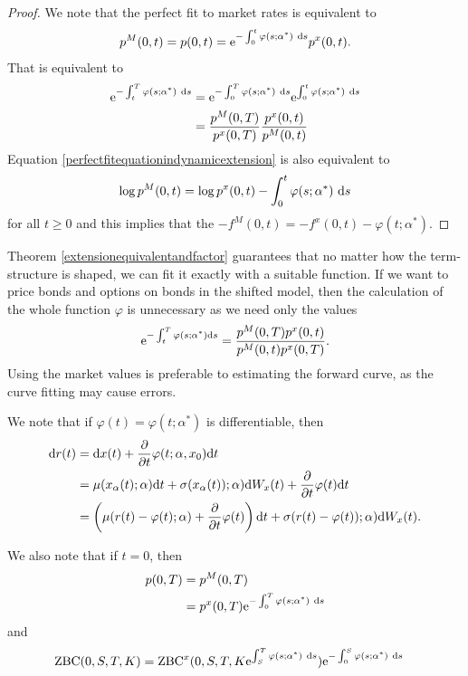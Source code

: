 \begin{proof}
We note that the perfect fit to market rates is equivalent to
	\begin{align}
		\label{perfectfitequationindynamicextension}
		p^M(0,t) = p(0,t) = \mathrm{e}^{ - \int_0^t \varphi(s; \alpha^*) \ \mathrm{d} s} p^x(0,t) .
	\end{align}
That is equivalent to
	\begin{align}
\mathrm{e}^{ - \int_t^T \varphi(s; \alpha^*) \ \mathrm{d} s} &= \mathrm{e}^{ - \int_0^T \varphi(s; \alpha^*) \ \mathrm{d} s} \mathrm{e}^{ \int_0^t \varphi(s; \alpha^*) \ \mathrm{d} s} \\
	&= \frac{p^M(0,T) }{ p^x(0,T)} \frac{ p^x(0,t)}{p^M(0,t) }
\end{align}
Equation \ref{perfectfitequationindynamicextension} is also equivalent to 
	\begin{align}
		\log p^M(0,t) = \log p^x(0,t) - \int_0^t \varphi(s; \alpha^*) \ \mathrm{d} s
	\end{align}
for all $t \geq 0$ and this implies that the $-f^M(0,t) = - f^x(0,t) -  \varphi(t; \alpha^*)$. 
\end{proof}

Theorem \ref{extensionequivalentandfactor} guarantees that no matter how the term-structure is shaped, we can fit it exactly with a suitable function. If we want to price bonds and options on bonds in the shifted model, then the calculation of the whole function $\varphi$ is unnecessary as we need only the values
		\begin{align}
\mathrm{e}^{-\int_t^T \varphi(s; \alpha^*) \mathrm{d} s} = \frac{p^M(0,T) p^x(0,t)}{p^M(0,t) p^x(0,T)} .
\end{align}	
Using the market values is preferable to estimating the forward curve, as the curve fitting may cause errors.

We note that if $\varphi(t) = \varphi(t; \alpha^*)$ is differentiable, then
	\begin{align}
		\mathrm{d} r(t) &= \mathrm{d} x(t) + \frac{\partial}{\partial t} \varphi(t; \alpha, x_0) \mathrm{d} t \\
			&= \mu(x_{\alpha}(t); \alpha) \mathrm{d} t + \sigma(x_{\alpha}(t)); \alpha) \mathrm{d} W_x(t) + \frac{\partial}{\partial t} \varphi(t) \mathrm{d} t \\
			&= \left( \mu(r(t) - \varphi(t); \alpha) + \frac{\partial}{\partial t} \varphi(t) \right) \mathrm{d} t + \sigma(r(t) - \varphi(t)); \alpha) \mathrm{d} W_x(t) .
	\end{align}
	
We also note that if $t=0$, then
	\begin{align}
		p(0,T) &= p^M(0,T) \\ &=  p^x(0,T) \mathrm{e}^{ - \int_0^T \varphi(s; \alpha^*) \ \mathrm{d} s}
	\end{align}
and
	\begin{align}
		\operatorname{\mathrm{ZBC}}(0,S,T,K) &=  \operatorname{\mathrm{ZBC}}^x(0,S,T,K\mathrm{e}^{ \int_S^T \varphi(s; \alpha^*) \ \mathrm{d} s}) \mathrm{e}^{ - \int_0^S \varphi(s; \alpha^*) \ \mathrm{d} s}
	\end{align}


